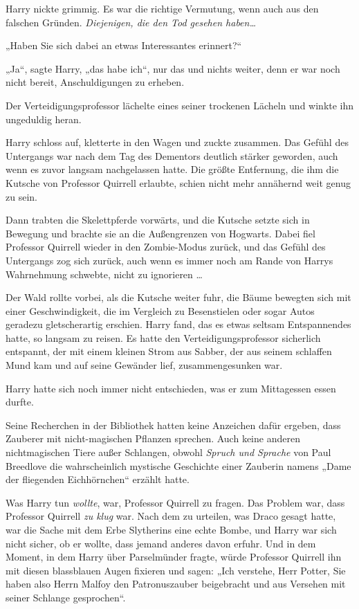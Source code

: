 {Harry nickte grimmig. Es war die richtige Vermutung, wenn auch aus den falschen Gründen. \emph{Diejenigen, die den Tod gesehen haben…}

„Haben Sie sich dabei an etwas Interessantes erinnert?“

„Ja“, sagte Harry, „das habe ich“, nur das und nichts weiter, denn er war noch nicht bereit, Anschuldigungen zu erheben.

Der Verteidigungsprofessor lächelte eines seiner trockenen Lächeln und winkte ihn ungeduldig heran.

Harry schloss auf, kletterte in den Wagen und zuckte zusammen. Das Gefühl des Untergangs war nach dem Tag des Dementors deutlich stärker geworden, auch wenn es zuvor langsam nachgelassen hatte. Die größte Entfernung, die ihm die Kutsche von Professor Quirrell erlaubte, schien nicht mehr annähernd weit genug zu sein.

Dann trabten die Skelettpferde vorwärts, und die Kutsche setzte sich in Bewegung und brachte sie an die Außengrenzen von Hogwarts. Dabei fiel Professor Quirrell wieder in den Zombie-Modus zurück, und das Gefühl des Untergangs zog sich zurück, auch wenn es immer noch am Rande von Harrys Wahrnehmung schwebte, nicht zu ignorieren …

Der Wald rollte vorbei, als die Kutsche weiter fuhr, die Bäume bewegten sich mit einer Geschwindigkeit, die im Vergleich zu Besenstielen oder sogar Autos geradezu gletscherartig erschien. Harry fand, das es etwas seltsam Entspannendes hatte, so langsam zu reisen. Es hatte den Verteidigungsprofessor sicherlich entspannt, der mit einem kleinen Strom aus Sabber, der aus seinem schlaffen Mund kam und auf seine Gewänder lief, zusammengesunken war.

Harry hatte sich noch immer nicht entschieden, was er zum Mittagessen essen durfte.

Seine Recherchen in der Bibliothek hatten keine Anzeichen dafür ergeben, dass Zauberer mit nicht-magischen Pflanzen sprechen. Auch keine anderen nichtmagischen Tiere außer Schlangen, obwohl \emph{Spruch und Sprache} von Paul Breedlove die wahrscheinlich mystische Geschichte einer Zauberin namens „Dame der fliegenden Eichhörnchen“ erzählt hatte.

Was Harry tun \emph{wollte}, war, Professor Quirrell zu fragen. Das Problem war, dass Professor Quirrell \emph{zu klug} war. Nach dem zu urteilen, was Draco gesagt hatte, war die Sache mit dem Erbe Slytherins eine echte Bombe, und Harry war sich nicht sicher, ob er wollte, dass jemand anderes davon erfuhr. Und in dem Moment, in dem Harry über Parselmünder fragte, würde Professor Quirrell ihn mit diesen blassblauen Augen fixieren und sagen: „Ich verstehe, Herr Potter, Sie haben also Herrn Malfoy den Patronuszauber beigebracht und aus Versehen mit seiner Schlange gesprochen“.

}
